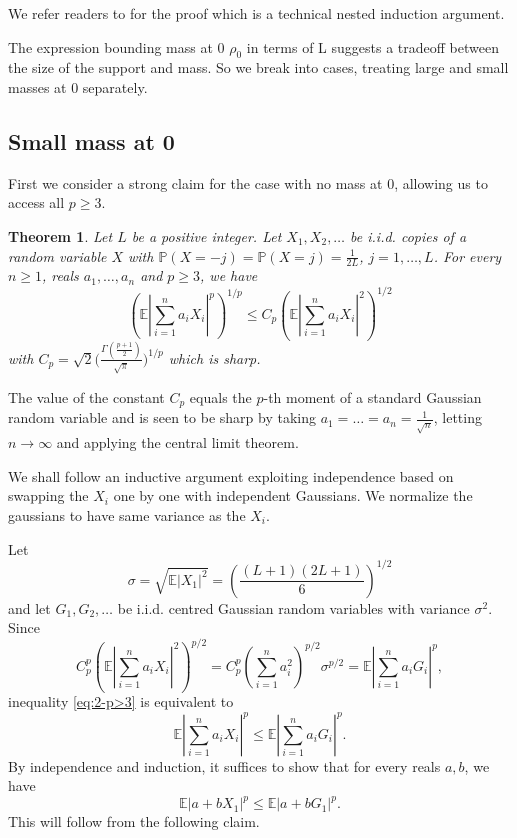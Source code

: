 \documentclass[10pt]{article}
\newcommand{\E}{\mathbb{E}}
\newcommand{\1}{\textbf{1}}
\newcommand{\p}[1]{\mathbb{P}\left( #1 \right)}
\newtheorem{theorem}{Theorem}
\theoremstyle{remark}
\theoremstyle{definition}
\begin{document}
We refer readers to \cite{HT} for the proof which is a technical nested induction argument.

The expression bounding mass at 0 $\rho_0$ in terms of L suggests a tradeoff between the size of the support and mass. So we break into cases, treating large and small masses at 0 separately. 

\subsection{Small mass at 0}

First we consider a strong claim for the case with no mass at 0, allowing us to access all $p \geq 3$. 

\begin{theorem}\label{thm:2-p>3}
Let $L$ be a positive integer. Let $X_1,X_2,\ldots$ be i.i.d. copies of a random variable $X$ with $\p{X = -j} = \p{X = j} = \frac{1}{2L}$, $j = 1, \ldots, L$. For every $n \geq 1$, reals $a_1,\ldots,a_n$ and $p \geq 3$, we have
\begin{equation}\label{eq:2-p>3}
\left(\E\left|\sum_{i=1}^n a_iX_i \right|^p\right)^{1/p} \leq C_p \left(\E\left|\sum_{i=1}^n a_iX_i \right|^2\right)^{1/2} 
\end{equation}
with $C_p = \sqrt{2} \Big(\frac{\Gamma (\frac{p+1}{2})}{\sqrt{\pi}} \Big)^{1/p}$ which is sharp.
\end{theorem}

The value of the constant $C_p$ equals the $p$-th moment of a standard Gaussian random variable and is seen to be sharp by taking $a_1 = \ldots = a_n = \frac{1}{\sqrt{n}}$, letting $n \to \infty$ and applying the central limit theorem.

We shall follow an inductive argument exploiting independence based on swapping the $X_i$ one by one with independent Gaussians. We normalize the gaussians to have same variance as the $X_i$. 

Let 
\begin{equation}\label{eq:def-sigma}
\sigma  = \sqrt{\E |X_1|^2} = \left(\frac{(L+1)(2L+1)}{6}\right)^{1/2}
\end{equation}
and let $G_1, G_2, \ldots$ be i.i.d. centred Gaussian random variables with variance $\sigma^2$. Since
\[
C_p^p\left(\E\left|\sum_{i=1}^n a_iX_i \right|^2\right)^{p/2} = C_p^p\left(\sum_{i=1}^n a_i^2\right)^{p/2}\sigma^{p/2} = \E\left|\sum_{i=1}^n a_iG_i \right|^p,
\]
inequality \eqref{eq:2-p>3} is equivalent to
\[
 \E\left|\sum_{i=1}^n a_iX_i \right|^p \leq  \E\left|\sum_{i=1}^n a_iG_i \right|^p.
\]
By independence and induction, it suffices to show that for every reals $a, b$, we have
\begin{equation}\label{eq:XvsG}
\E|a+bX_1|^p \leq \E|a+bG_1|^p.
\end{equation}
This will follow from the following claim.
\end{document}
